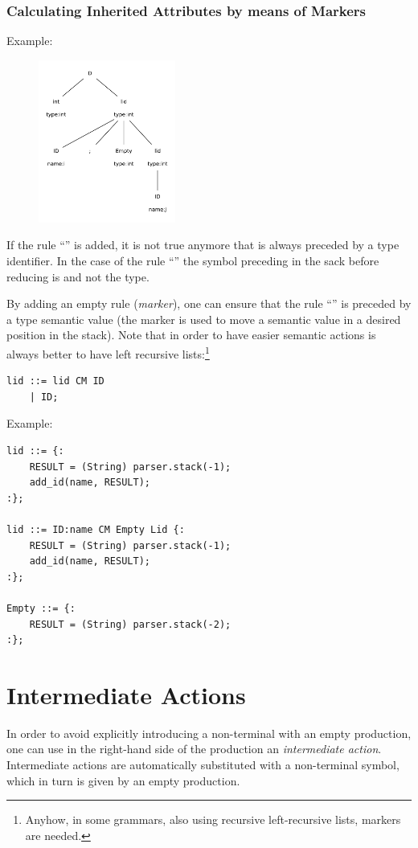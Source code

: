 \subsubsection{Calculating Inherited Attributes by means of Markers}
Example:
\begin{figure}[H]
    \centerline{\includegraphics[width=0.4\textwidth]{img/35.pdf}}
\end{figure}
If the rule ``'' is added, it is not true anymore that  is always preceded by a type identifier.
In the case of the rule ``'' the symbol preceding  in the sack before reducing is  and not the type.

By adding an empty rule (\emph{marker}), one can ensure that the rule ``'' is preceded by a type semantic value (the marker is used to move a semantic value in a desired position in the stack).
Note that in order to have easier semantic actions is always better to have left recursive lists:\footnote{Anyhow, in some grammars, also using recursive left-recursive lists, markers are needed.}
\begin{lstlisting}
lid ::= lid CM ID
    | ID;
\end{lstlisting}

Example:
\begin{lstlisting}
lid ::= {:
    RESULT = (String) parser.stack(-1);
    add_id(name, RESULT);
:};

lid ::= ID:name CM Empty Lid {:
    RESULT = (String) parser.stack(-1);
    add_id(name, RESULT);
:};

Empty ::= {:
    RESULT = (String) parser.stack(-2);
:};
\end{lstlisting}

\section{Intermediate Actions}
In order to avoid explicitly introducing a non-terminal with an empty production, one can use in the right-hand side of the production an \emph{intermediate action}.
Intermediate actions are automatically substituted with a non-terminal symbol, which in turn is given by an empty production.

